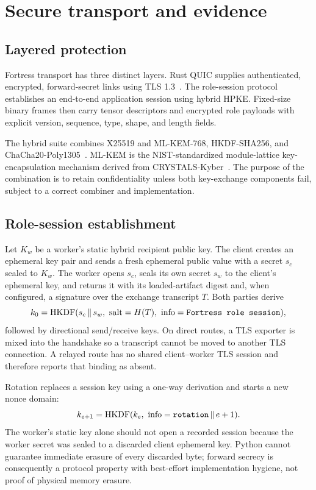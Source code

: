 \section{Secure transport and evidence}\label{sec:transport}

\subsection{Layered protection}

Fortress transport has three distinct layers. Rust QUIC supplies authenticated, encrypted, forward-secret links using TLS 1.3~\cite{rfc9000,rfc8446}. The role-session protocol establishes an end-to-end application session using hybrid HPKE. Fixed-size binary frames then carry tensor descriptors and encrypted role payloads with explicit version, sequence, type, shape, and length fields.

The hybrid suite combines X25519 and ML-KEM-768, HKDF-SHA256, and ChaCha20-Poly1305~\cite{rfc9180,fips203,rfc8439}. ML-KEM is the NIST-standardized module-lattice key-encapsulation mechanism derived from CRYSTALS-Kyber~\cite{kyber}. The purpose of the combination is to retain confidentiality unless both key-exchange components fail, subject to a correct combiner and implementation.

\subsection{Role-session establishment}

Let $K_w$ be a worker's static hybrid recipient public key. The client creates an ephemeral key pair and sends a fresh ephemeral public value with a secret $s_c$ sealed to $K_w$. The worker opens $s_c$, seals its own secret $s_w$ to the client's ephemeral key, and returns it with its loaded-artifact digest and, when configured, a signature over the exchange transcript $T$. Both parties derive
\begin{equation}
k_0=\HKDF(s_c\,\|\,s_w,\ \text{salt}=H(T),\ \text{info}=\texttt{Fortress role session}),
\end{equation}
followed by directional send/receive keys. On direct routes, a TLS exporter is mixed into the handshake so a transcript cannot be moved to another TLS connection. A relayed route has no shared client--worker TLS session and therefore reports that binding as absent.

Rotation replaces a session key using a one-way derivation and starts a new nonce domain:
\begin{equation}
k_{e+1}=\HKDF(k_e,\ \text{info}=\texttt{rotation}\,\|\,e+1).
\end{equation}
The worker's static key alone should not open a recorded session because the worker secret was sealed to a discarded client ephemeral key. Python cannot guarantee immediate erasure of every discarded byte; forward secrecy is consequently a protocol property with best-effort implementation hygiene, not proof of physical memory erasure.


